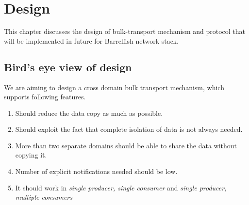 \documentclass[a4paper,twoside]{report} %
\begin{document}
\chapter{Design}
This chapter discusses the design of bulk-transport mechanism and
protocol that will be implemented in future for Barrelfish network
stack.


\section{Bird's eye view of design}
We are aiming to design a cross domain bulk transport mechanism,
which supports following features.
\begin{enumerate}
  \item Should reduce the data copy as much as possible.
  \item Should exploit the fact that complete isolation of data
  is not always needed.
  \item More than two separate domains should be able to share
  the data without copying it.
  \item Number of explicit notifications needed should be low.
  \item It should work in \textit{single producer, single consumer}
  and \textit{single producer, multiple consumers}
\end{enumerate}
\end{document}
